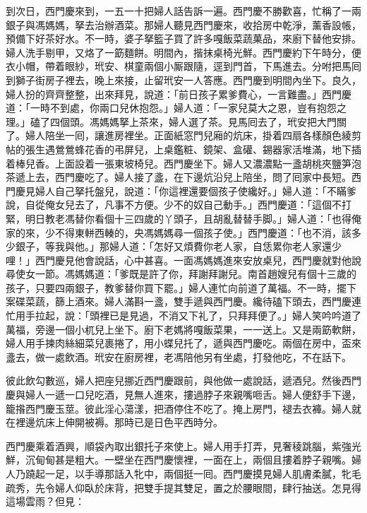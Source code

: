 到次日，西門慶來到，一五一十把婦人話告訴一遍。西門慶不勝歡喜，忙稱了一兩銀子與馮媽媽，拏去治辦酒菜。那婦人聽見西門慶來，收拾房中乾淨，薰香設帳，預備下好茶好水。不一時，婆子拏籃子買了許多嘎飯菜蔬菓品，來廚下替他安排。婦人洗手剔甲，又烙了一筯麵餅。明間內，揩抹桌椅光鮮。西門慶約下午時分，便衣小帽，帶着眼紗，玳安、棋童兩個小厮跟隨，逕到門首，下馬進去。分咐把馬囘到獅子街房子裡去，晚上來接，止留玳安一人答應。西門慶到明間內坐下。良久，婦人扮的齊齊整整，出來拜見，說道：「前日孩子累爹費心，一言難盡。」西門慶道：「一時不到處，你兩口兒休抱怨。」婦人道：「一家兒莫大之恩，豈有抱怨之理。」磕了四個頭。馮媽媽拏上茶來，婦人選了茶。見馬囘去了，玳安把大門關了。{}婦人陪坐一囘，讓進房裡坐。正面紙窓門兒廂的炕床，掛着四扇各樣顏色綾剪帖的張生遇鶯鶯蜂花香的弔屏兒，上桌鑑粧、鏡架、盒礶、錫器家活堆滿，地下插着棒兒香。{}上面設着一張東坡椅兒。{}西門慶坐下。婦人又濃濃點一盞胡桃夾鹽笋泡茶遞上去，西門慶吃了。婦人接了盞，在下邊炕沿兒上陪坐，問了囘家中長短。西門慶見婦人自己拏托盤兒，說道：「你這裡還要個孩子使纔好。」婦人道：「不瞞爹說，自從俺女兒去了，凡事不方便。少不的奴自己動手。」西門慶道：「這個不打緊，明日教老馮替你看個十三四歲的丫頭子，且胡亂替替手脚。」婦人道：「也得俺家的來，少不得東軿西輳的，{}央馮媽媽尋一個孩子使。」西門慶道：「也不消，該多少銀子，等我與他。」那婦人道：「怎好又煩費你老人家，自恁累你老人家還少哩！」西門慶見他會說話，心中甚喜。一面馮媽媽進來安放桌兒，西門慶就對他說尋使女一節。馮媽媽道：「爹既是許了你，拜謝拜謝兒。南首趙嫂兒有個十三歲的孩子，只要四兩銀子，教爹替你買下罷。」婦人連忙向前道了萬福。不一時，擺下案碟菜蔬，篩上酒來。婦人滿斟一盞，雙手遞與西門慶。纔待磕下頭去，西門慶連忙用手拉起，說：「頭裡已是見過，不消又下礼了，只拜拜便了。」婦人笑吟吟道了萬福，旁邊一個小杌兒上坐下。廚下老媽將嘎飯菜果，一一送上。又是兩筯軟餅，婦人用手揀肉絲細菜兒裹捲了，用小蝶兒托了，遞與西門慶吃。兩個在房中，盃來盞去，做一處飲酒。玳安在廚房裡，老馮陪他另有坐處，打發他吃，不在話下。

彼此飲勾數巡，婦人把座兒挪近西門慶跟前，{}與他做一處說話，遞酒兒。然後西門慶與婦人一遞一口兒吃酒，見無人進來，摟過脖子來親嘴咂舌。婦人便舒手下邊，籠揝西門慶玉莖。彼此淫心蕩漾，把酒停住不吃了。掩上房門，褪去衣褲。婦人就在裡邊炕床上伸開被褥。那時已是日色平西時分。

西門慶乘着酒興，順袋內取出銀托子來使上。婦人用手打弄，見奢稜跳腦，紫強光鮮，沉甸甸甚是粗大。一壁坐在西門慶懷裡，一面在上，兩個且摟着脖子親嘴。婦人乃蹺起一足，以手導那話入牝中，兩個挺一囘。西門慶摸見婦人肌膚柔膩，牝毛疏秀，先令婦人仰臥於床背，把雙手提其雙足，置之於腰眼間，肆行抽送。怎見得這場雲雨？但見：

